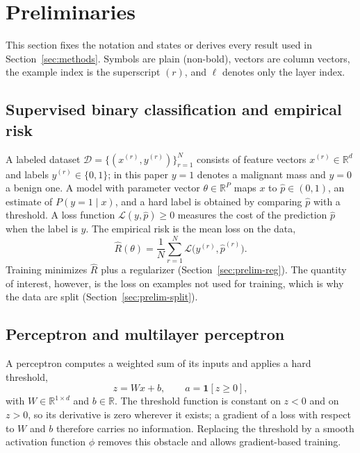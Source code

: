 \section{Preliminaries}
\label{sec:prelim}

This section fixes the notation and states or derives every result used in Section~\ref{sec:methods}. Symbols are plain (non-bold), vectors are column vectors, the example index is the superscript $(r)$, and $\ell$ denotes only the layer index.

\subsection{Supervised binary classification and empirical risk}
\label{sec:prelim-erm}

A labeled dataset $\mathcal{D}=\{(x^{(r)},y^{(r)})\}_{r=1}^{N}$ consists of feature vectors $x^{(r)}\in\mathbb{R}^{d}$ and labels $y^{(r)}\in\{0,1\}$; in this paper $y=1$ denotes a malignant mass and $y=0$ a benign one. A model with parameter vector $\theta\in\mathbb{R}^{P}$ maps $x$ to $\hat p\in(0,1)$, an estimate of $P(y=1\mid x)$, and a hard label is obtained by comparing $\hat p$ with a threshold. A loss function $\mathcal{L}(y,\hat p)\ge 0$ measures the cost of the prediction $\hat p$ when the label is $y$. The empirical risk is the mean loss on the data,
\begin{equation}
  \widehat{R}(\theta)=\frac{1}{N}\sum_{r=1}^{N}\mathcal{L}\bigl(y^{(r)},\hat p^{(r)}\bigr).
  \label{eq:emprisk}
\end{equation}
Training minimizes $\widehat{R}$ plus a regularizer (Section~\ref{sec:prelim-reg}). The quantity of interest, however, is the loss on examples not used for training, which is why the data are split (Section~\ref{sec:prelim-split}).

\subsection{Perceptron and multilayer perceptron}
\label{sec:prelim-mlp}

A perceptron computes a weighted sum of its inputs and applies a hard threshold,
\begin{equation}
  z=Wx+b,\qquad a=\mathbf{1}[z\ge 0],
  \label{eq:perceptron}
\end{equation}
with $W\in\mathbb{R}^{1\times d}$ and $b\in\mathbb{R}$. The threshold function is constant on $z<0$ and on $z>0$, so its derivative is zero wherever it exists; a gradient of a loss with respect to $W$ and $b$ therefore carries no information. Replacing the threshold by a smooth activation function $\phi$ removes this obstacle and allows gradient-based training.

